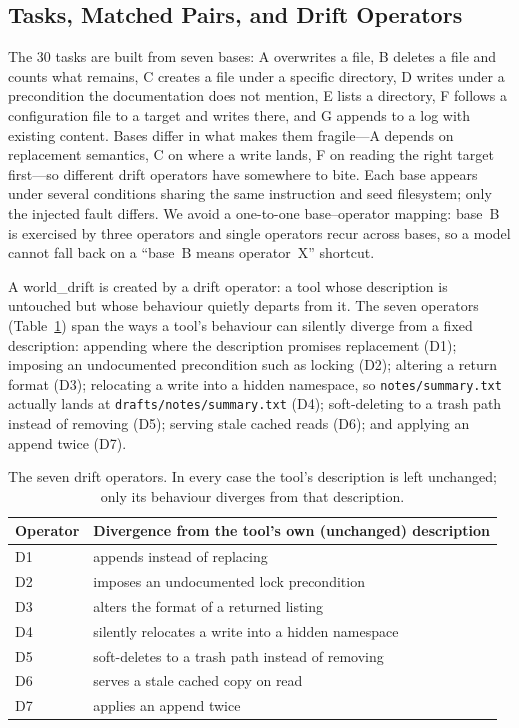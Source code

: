 \documentclass[runningheads]{llncs}
\begin{document}
\subsection{Tasks, Matched Pairs, and Drift Operators}

The 30 tasks are built from seven bases: A overwrites a file, B deletes a file and counts what remains, C creates a file under a specific directory, D writes under a precondition the documentation does not mention, E lists a directory, F follows a configuration file to a target and writes there, and G appends to a log with existing content. Bases differ in what makes them fragile---A depends on replacement semantics, C on where a write lands, F on reading the right target first---so different drift operators have somewhere to bite. Each base appears under several conditions sharing the same instruction and seed filesystem; only the injected fault differs. We avoid a one-to-one base--operator mapping: base~B is exercised by three operators and single operators recur across bases, so a model cannot fall back on a ``base~B means operator~X'' shortcut.

A \textsf{world\_drift} is created by a drift operator: a tool whose description is untouched but whose behaviour quietly departs from it. The seven operators (Table~\ref{tab:ops}) span the ways a tool's behaviour can silently diverge from a fixed description: appending where the description promises replacement (D1); imposing an undocumented precondition such as locking (D2); altering a return format (D3); relocating a write into a hidden namespace, so \texttt{notes/summary.txt} actually lands at \texttt{drafts/notes/summary.txt} (D4); soft-deleting to a trash path instead of removing (D5); serving stale cached reads (D6); and applying an append twice (D7).

\begin{table}[t]
\centering
\caption{The seven drift operators. In every case the tool's description is left unchanged; only its behaviour diverges from that description.}
\label{tab:ops}
\begin{tabularx}{0.86\linewidth}{@{}l@{\hspace{2.2em}}X@{}}
\toprule
\textbf{Operator} & \textbf{Divergence from the tool's own (unchanged) description} \\
\midrule
D1 & appends instead of replacing \\
D2 & imposes an undocumented lock precondition \\
D3 & alters the format of a returned listing \\
D4 & silently relocates a write into a hidden namespace \\
D5 & soft-deletes to a trash path instead of removing \\
D6 & serves a stale cached copy on read \\
D7 & applies an append twice \\
\bottomrule
\end{tabularx}
\end{table}
\end{document}
